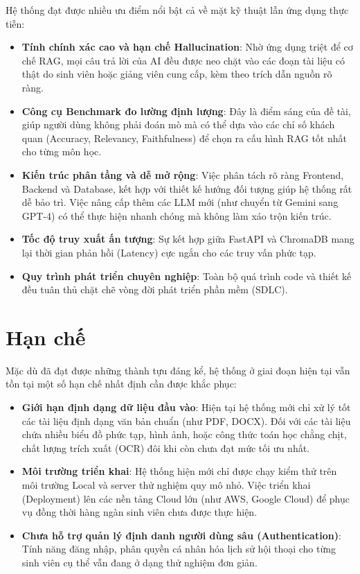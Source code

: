 Hệ thống đạt được nhiều ưu điểm nổi bật cả về mặt kỹ thuật lẫn ứng dụng thực tiễn:
\begin{itemize}
	\item \textbf{Tính chính xác cao và hạn chế Hallucination}: Nhờ ứng dụng triệt để cơ chế RAG, mọi câu trả lời của AI đều được neo chặt vào các đoạn tài liệu có thật do sinh viên hoặc giảng viên cung cấp, kèm theo trích dẫn nguồn rõ ràng.
	\item \textbf{Công cụ Benchmark đo lường định lượng}: Đây là điểm sáng của đề tài, giúp người dùng không phải đoán mò mà có thể dựa vào các chỉ số khách quan (Accuracy, Relevancy, Faithfulness) để chọn ra cấu hình RAG tốt nhất cho từng môn học.
	\item \textbf{Kiến trúc phân tầng và dễ mở rộng}: Việc phân tách rõ ràng Frontend, Backend và Database, kết hợp với thiết kế hướng đối tượng giúp hệ thống rất dễ bảo trì. Việc nâng cấp thêm các LLM mới (như chuyển từ Gemini sang GPT-4) có thể thực hiện nhanh chóng mà không làm xáo trộn kiến trúc.
	\item \textbf{Tốc độ truy xuất ấn tượng}: Sự kết hợp giữa FastAPI và ChromaDB mang lại thời gian phản hồi (Latency) cực ngắn cho các truy vấn phức tạp.
	\item \textbf{Quy trình phát triển chuyên nghiệp}: Toàn bộ quá trình code và thiết kế đều tuân thủ chặt chẽ vòng đời phát triển phần mềm (SDLC).
\end{itemize}

\section{Hạn chế}

Mặc dù đã đạt được những thành tựu đáng kể, hệ thống ở giai đoạn hiện tại vẫn tồn tại một số hạn chế nhất định cần được khắc phục:
\begin{itemize}
	\item \textbf{Giới hạn định dạng dữ liệu đầu vào}: Hiện tại hệ thống mới chỉ xử lý tốt các tài liệu định dạng văn bản chuẩn (như PDF, DOCX). Đối với các tài liệu chứa nhiều biểu đồ phức tạp, hình ảnh, hoặc công thức toán học chằng chịt, chất lượng trích xuất (OCR) đôi khi còn chưa đạt mức tối ưu nhất.
	\item \textbf{Môi trường triển khai}: Hệ thống hiện mới chỉ được chạy kiểm thử trên môi trường Local và server thử nghiệm quy mô nhỏ. Việc triển khai (Deployment) lên các nền tảng Cloud lớn (như AWS, Google Cloud) để phục vụ đồng thời hàng ngàn sinh viên chưa được thực hiện.
	\item \textbf{Chưa hỗ trợ quản lý định danh người dùng sâu (Authentication)}: Tính năng đăng nhập, phân quyền cá nhân hóa lịch sử hội thoại cho từng sinh viên cụ thể vẫn đang ở dạng thử nghiệm đơn giản.
\end{itemize}

